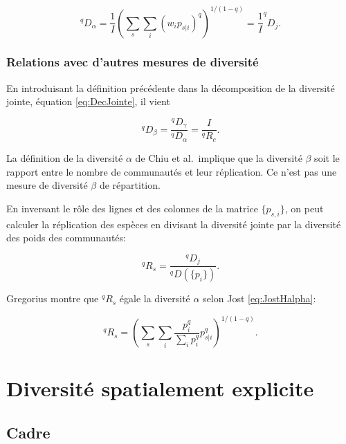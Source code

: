 \documentclass[
  11pt,
  french,
  a4paper,
  extrafontsizes,onecolumn,openright
  ]{memoir}
\begin{document}
\begin{equation}
  \label{eq:Chiualphajointe}
  ^{q}\!D_{\alpha}
  = \frac{1}{I} {\left(\sum_s{\sum_i{{\left(w_i p_{s|i}\right)}^q}}\right)}^{{1}/{\left(1-q\right)}}
  = \frac{1}{I} ^{q}\!D_{j}.
\end{equation}

\section{Relations avec d'autres mesures de diversité}\label{relations-avec-dautres-mesures-de-diversituxe9}

En introduisant la définition précédente dans la décomposition de la diversité jointe, équation \eqref{eq:DecJointe}, il vient

\begin{equation}
  \label{eq:DqbetaChiu}
  ^{q}\!D_{\beta}
  = \frac{^{q}\!D_{\gamma}}{^{q}\!D_{\alpha}}
  = \frac{I}{^{q}\!R_{c}}.
\end{equation}

La définition de la diversité \(\alpha\) de Chiu et al.~implique que la diversité \(\beta\) soit le rapport entre le nombre de communautés et leur réplication.
Ce n'est pas une mesure de diversité \(\beta\) de répartition.

En inversant le rôle des lignes et des colonnes de la matrice \(\{p_{s,i}\}\), on peut calculer la réplication des espèces en divisant la diversité jointe par la diversité des poids des communautés:

\begin{equation}
  \label{eq:Replication}
  ^{q}\!R_{s}
  = \frac{^{q}\!D_{j}}{^{q}\!D\left(\{p_{i}\}\right)}.
\end{equation}

Gregorius montre que \(^{q}\!R_{s}\) égale la diversité \(\alpha\) selon Jost \eqref{eq:JostHalpha}:

\begin{equation}
  \label{eq:JostGregorius}
  ^{q}\!R_{s}
  = {\left(\sum_s{\sum_i{\frac{p^q_i}{\sum_i{p^q_i}}p^q_{s|i}}}\right)}^{{1}/{\left(1-q\right)}}.
\end{equation}

\part{Diversité spatialement explicite}\label{part-diversituxe9-spatialement-explicite}

\chapter{Cadre}\label{sec-spatialCadre}
\end{document}
